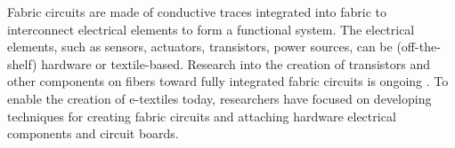 

Fabric circuits are made of conductive traces integrated into fabric to interconnect electrical elements to form a functional system. The electrical elements, such as sensors, actuators, transistors, power sources, can be (off-the-shelf) hardware or textile-based. Research into the creation of transistors and other components on fibers toward fully integrated fabric circuits is ongoing \cite{schwarz2010steps}. 
To enable the creation of e-textiles today, researchers have focused on developing techniques for creating fabric circuits and attaching hardware electrical components and circuit boards. 









